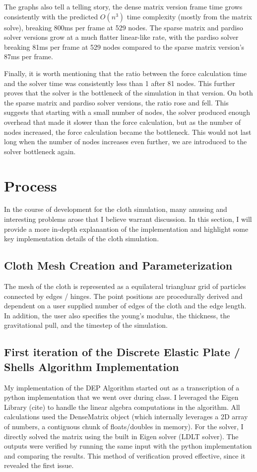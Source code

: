 \documentclass[letterpaper, 10 pt, conference]{ieeeconf}  %
\begin{document}
The graphs also tell a telling story, the dense matrix version frame time grows consistently with the predicted $O(n^3)$ time complexity (mostly from the matrix solve), breaking 800ms per frame at 529 nodes. The sparse matrix and pardiso solver versions grow at a much flatter linear-like rate, with the pardiso solver breaking 81ms per frame at 529 nodes compared to the sparse matrix version's 87ms per frame.

Finally, it is worth mentioning that the ratio between the force calculation time and the solver time was consistently less than 1 after 81 nodes. This further proves that the solver is the bottleneck of the simulation in that version. On both the sparse matrix and pardiso solver versions, the ratio rose and fell. This suggests that starting with a small number of nodes, the solver produced enough overhead that made it slower than the force calculation, but as the number of nodes increased, the force calculation became the bottleneck. This would not last long when the number of nodes increases even further, we are introduced to the solver bottleneck again.


\section{Process}
 In the course of development for the cloth simulation, many amusing and interesting problems arose that I believe warrant discussion. In this section, I will provide a more in-depth explanantion of the implementation and highlight some key implementation details of the cloth simulation.

\subsection{Cloth Mesh Creation and Parameterization}
The mesh of the cloth is represented as a equilateral triangluar grid of particles connected by edges / hinges. The point positions are procedurally derived and dependent on a user supplied number of edges of the cloth and the edge length. In addition, the user also specifies the young's modulus, the thickness, the gravitational pull, and the timestep of the simulation.

\subsection{First iteration of the Discrete Elastic Plate / Shells Algorithm Implementation}

My implementation of the DEP Algorithm started out as a transcription of a python implementation that we went over during class. I leveraged the Eigen Library (cite) to handle the linear algebra computations in the algorithm. All calculations used the DenseMatrix object (which internally leverages a 2D array of numbers, a contiguous chunk of floats/doubles in memory). For the solver, I directly solved the matrix using the built in Eigen solver (LDLT solver). The outputs were verified by running the same input with the python implementation and comparing the results. This method of verification proved effective, since it revealed the first issue. 
\end{document}
